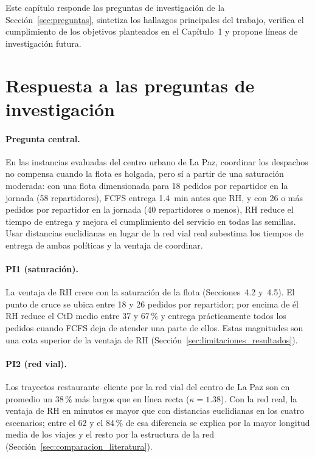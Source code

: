 \documentclass[12pt,letterpaper,oneside]{book}
\begin{document}
	Este capítulo responde las preguntas de investigación de la
	Sección~\ref{sec:preguntas}, sintetiza los hallazgos principales del trabajo, verifica el
	cumplimiento de los objetivos planteados en el Capítulo~1 y propone líneas de
	investigación futura.

	\section{Respuesta a las preguntas de investigación}
	\label{sec:respuestas_preguntas}

	\paragraph{Pregunta central.}  En las instancias evaluadas del centro urbano de La Paz,
	coordinar los despachos no compensa cuando la flota es holgada, pero sí a partir de una
	saturación moderada: con una flota dimensionada para 18 pedidos por repartidor en la jornada
	(58 repartidores), FCFS entrega 1.4~min antes que RH, y con 26 o más pedidos por repartidor en
	la jornada (40 repartidores o menos), RH reduce el tiempo de entrega y mejora el cumplimiento del
	servicio en todas las semillas.  Usar distancias euclidianas en lugar de la red vial real
	subestima los tiempos de entrega de ambas políticas y la ventaja de coordinar.

	\paragraph{PI1 (saturación).}  La ventaja de RH crece con la saturación de la flota
	(Secciones~4.2 y~4.5).  El punto de cruce se ubica entre 18 y 26 pedidos por repartidor; por
	encima de él RH reduce el CtD medio entre 37 y 67\,\% y entrega prácticamente todos los
	pedidos cuando FCFS deja de atender una parte de ellos.  Estas magnitudes son una cota
	superior de la ventaja de RH (Sección~\ref{sec:limitaciones_resultados}).

	\paragraph{PI2 (red vial).}  Los trayectos restaurante--cliente por la red vial del centro de
	La Paz son en promedio un 38\,\% más largos que en línea recta ($\kappa = 1{.}38$).  Con la red
	real, la ventaja de RH en minutos es mayor que con distancias euclidianas en los cuatro
	escenarios; entre el 62 y el 84\,\% de esa diferencia se explica por la mayor longitud media de
	los viajes y el resto por la estructura de la red (Sección~\ref{sec:comparacion_literatura}).
\end{document}

